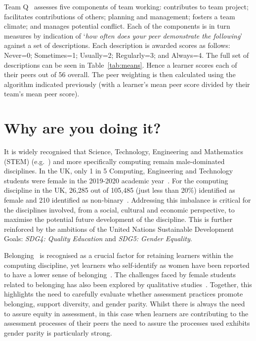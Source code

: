 \documentclass[sigconf, anonymous=false]{acmart}
\begin{document}
Team Q~\cite{Britton2017} assesses five components of team working:
contributes to team project; facilitates contributions of others;
planning and management; fosters a team climate; and manages potential
conflict. Each of the components is in turn measures by indication of
`{\emph{how often does your peer demonstrate the following}}' against
a set of descriptions. Each description is awarded scores as follows:
Never=0; Sometimes=1; Usually=2; Regularly=3; and Always=4. The
full set of descriptions can be seen in Table~\ref{tab:means}. Hence a
learner scores each of their peers out of 56 overall. The peer
weighting is then calculated using the algorithm indicated previously
(with a learner's mean peer score divided by their team's mean peer
score).



\section{Why are you doing it?}
It is widely recognised that Science, Technology, Engineering and
Mathematics (STEM) (e.g.~\cite{Baird2018}) and more specifically
computing remain male-dominated disciplines. In the UK, only 1 in 5
Computing, Engineering and Technology students were female in the
2019-2020 academic year~\cite{HESA}. For the computing discipline in
the UK, 26,285 out of 105,485 (just less than 20\%) identified as
female and 210 identified as non-binary~\cite{HESA}. Addressing this
imbalance is critical for the disciplines involved, from a social,
cultural and economic perspective, to maximise the potential future
development of the discipline. This is further reinforced by the
ambitions of the United Nations Sustainable Development Goals:
{\emph{SDG4: Quality Education}} and {\emph{SDG5: Gender Equality}}.

Belonging~\cite{Veilleux2013} is recognised as a crucial factor for
retaining learners within the computing discipline, yet learners who
self-identify as women have been reported to have a lower sense of
belonging~\cite{Mooney2020}. The challenges faced by female students
related to belonging has also been explored by qualitative
studies~\cite{Winter2021}. Together, this highlights the need to
carefully evaluate whether assessment practices promote belonging,
support diversity, and gender parity. Whilst there is always the need
to assure equity in assessment, in this case when learners are
contributing to the assessment processes of their peers the need to
assure the processes used exhibits gender parity is particularly
strong.
\end{document}
